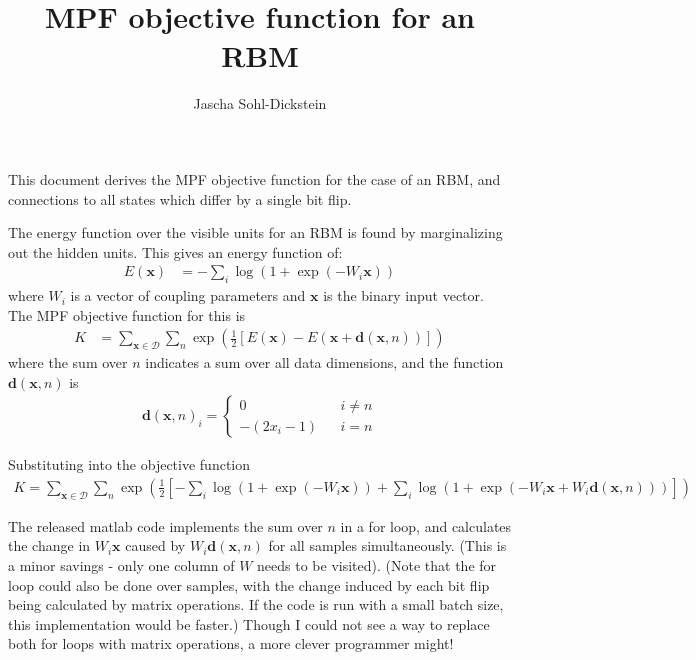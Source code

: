 \documentclass{article}
\title{MPF objective function for an RBM}
\author{
Jascha Sohl-Dickstein
}
\newcommand{\mb}{\mathbf}
\begin{document}
\maketitle

This document derives the MPF objective function for the case of an RBM, and connections to all states which differ by a single bit flip. %

The energy function over the visible
units for an RBM is found by marginalizing out the hidden units.  This
gives an energy function of:
\begin{align}
E(\mb x) &= -\sum_i \log ( 1 + \exp ( -W_i \mb x ) )
\end{align}
where $W_i$ is a vector of coupling parameters and $\mb x$ is the binary input
vector.  The MPF objective function for this is
\begin{align}
K &= \sum_{\mb x \in \mathcal D} \sum_n \exp\left( \frac{1}{2}\left[
E(\mb x) - E(\mb x + {\mb d}(\mb x, n)) \right] \right)
\end{align}
where the sum over $n$ indicates a sum over all data dimensions, and
the function ${\mb d}(\mb x, n)$ is
\begin{align}
{\mb d}(\mb x, n)_i =
	\left\{\begin{array}{ccc}
0 & & i \neq n \\
-(2 x_i - 1) & & i = n
	\end{array}\right.
\end{align}

Substituting into the objective function
\begin{align}
K = \sum_{\mb x \in \mathcal D} \sum_n \exp\left( \frac{1}{2}\left[
-\sum_i \log ( 1 + \exp ( -W_i \mb x ) )
+
\sum_i \log ( 1 + \exp ( -W_i \mb x + W_i {\mb d}(\mb x, n)  ) )
\right] \right)
\end{align}

The released matlab code implements the sum over $n$ in a for loop, and
calculates the change in $W_i \mb x$ caused by $W_i {\mb d}( \mb x, n)$ for all samples simultaneously.  (This is a minor savings - only one column of $W$ needs to be visited).  (Note that the for loop could also
be done over samples, with the change induced by each bit flip being
calculated by matrix operations.  If the code is run with a small
batch size, this implementation would be faster.)  Though I could not
see a way to replace both for loops with matrix operations, a more
clever programmer might!
		
\end{document}
